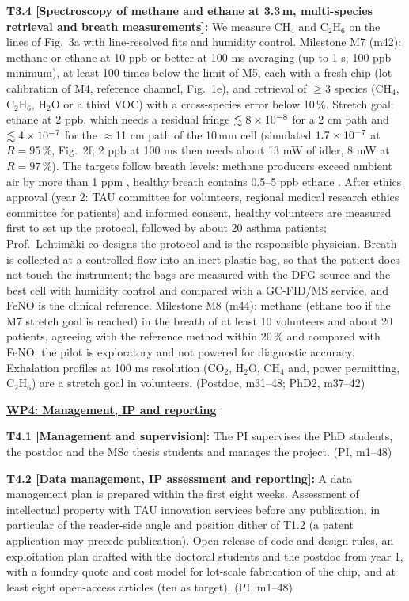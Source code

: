 \documentclass[a4paper,12pt]{article}
\newcommand{\wc}[1]{\textcolor{dkmaroon}{#1}} %
\newcommand{\jc}[1]{\textcolor{dkrust}{#1}} %
\newcommand{\nc}[1]{\textcolor{dkleaf}{#1}} %
\renewcommand{\times}{\mathbin{\text{\texttimes}}}%
\begin{document}
\textbf{T3.4 [Spectroscopy of methane and ethane at 3.3\,\textmu{}m, multi-species retrieval and breath measurements]:} \jc{We measure CH$_4$ and C$_2$H$_6$ on the lines of Fig.~3a with line-resolved fits and humidity control. Milestone M7 (m42): methane or ethane at 10 ppb or better at 100 ms averaging (up to 1 s; 100 ppb minimum), at least 100 times below the limit of M5, each with a fresh chip (lot calibration of M4, reference channel, Fig.~1e), and retrieval of $\geq3$ species (CH$_4$, C$_2$H$_6$, H$_2$O or a third VOC) with a cross-species error below 10\,\%. Stretch goal: ethane at 2 ppb, which needs a residual fringe $\lesssim8\times10^{-8}$ for a 2 cm path and $\lesssim4\times10^{-7}$ for the $\approx$11 cm path of the 10\,mm cell (simulated \wc{$1.7\times10^{-7}$ at $R=95\,\%$}, Fig.~2f\wc{; 2 ppb at 100 ms then needs about 13 mW of idler, 8 mW at $R=97\,\%$}). The targets follow breath levels: methane producers exceed ambient air by more than 1 ppm \cite{Szabo2016}, healthy breath contains 0.5--5 ppb ethane \cite{Ross2014}. After ethics approval (year 2: TAU committee for volunteers, regional medical research ethics committee for patients) and informed consent, healthy volunteers are measured first to set up the protocol, followed by about 20 asthma patients; Prof.~Lehtim\"aki co-designs the protocol and is the responsible physician. Breath is collected at a controlled flow into an inert plastic bag, so that the patient does not touch the instrument; the bags are measured with the DFG source and the best cell with humidity control and compared with a GC-FID/MS service, and FeNO is the clinical reference. Milestone M8 (m44): methane (ethane too if the M7 stretch goal is reached) in the breath of at least 10 volunteers and about 20 patients, agreeing with the reference method within 20\,\% and compared with FeNO; the pilot is exploratory and not powered for diagnostic accuracy. Exhalation profiles at 100 ms resolution (CO$_2$, H$_2$O, CH$_4$ and, power permitting, C$_2$H$_6$) are a stretch goal in volunteers.} (Postdoc, m31--48; PhD2, m37--42)

\underline{\textbf{WP4: Management, IP and reporting}}

\textbf{T4.1 [Management and supervision]:} The PI supervises the PhD students, the postdoc and the MSc thesis students and manages the project. (PI, m1--48)

\textbf{T4.2 [Data management, IP assessment and reporting]:} A data management plan is prepared within the first eight weeks. Assessment of intellectual property with TAU innovation services before any publication, in particular of the \nc{reader-side angle and position dither} of T1.2 (a patent application may precede publication). Open release of code and design rules, an exploitation plan \nc{drafted with the doctoral students and the postdoc from year 1, with a foundry quote and cost model for lot-scale fabrication of the chip}, and at least eight open-access articles (ten as target). (PI, m1--48)
\end{document}
